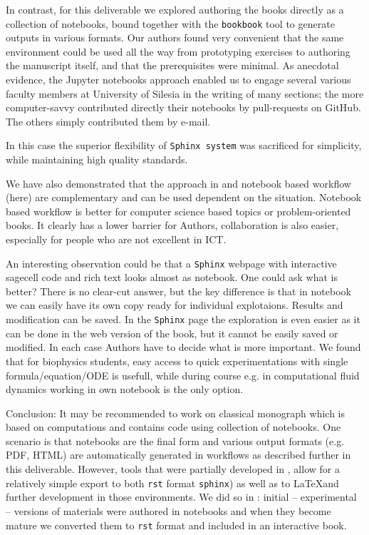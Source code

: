 \documentclass{deliverablereport}
\begin{document}
{{{In contrast, for this deliverable we explored authoring the books
directly as a collection of \Jupyter notebooks, bound together with
the \texttt{bookbook} tool to generate outputs in various formats. Our
authors found very convenient that the same environment could be used
all the way from prototyping exercises to authoring the manuscript
itself, and that the prerequisites were minimal. As anecdotal
evidence, the Jupyter notebooks approach enabled us to engage several
various faculty members at University of Silesia in the writing of
many sections; the more computer-savvy contributed directly their
notebooks by pull-requests on GitHub. The others simply contributed
them by e-mail.


In this case the superior flexibility of \texttt{Sphinx system} was
sacrificed for simplicity, while maintaining high quality standards.


We have also demonstrated that the approach in
 and notebook based workflow (here) are
complementary and can be used dependent on the situation. Notebook
based workflow is better for computer science based topics or
problem-oriented books. It clearly has a lower barrier for Authors,
collaboration is also easier, especially for people who are not
excellent in ICT.

An interesting observation could be that a \texttt{Sphinx} webpage
with interactive sagecell code and rich text looks almost as \Jupyter
notebook. One could ask what is better? There is no clear-cut answer,
but the key difference is that in \Jupyter notebook we can easily have
its own copy ready for individual explotaions. Results and
modification can be saved.  In the \texttt{Sphinx} page the
exploration is even easier as it can be done in the web version of the
book, but it cannot be easily saved or modified. In each case Authors have to
decide what is more important. We found that for biophysics students,
easy access to quick experimentations with single formula/equation/ODE
is usefull, while during course e.g. in computational fluid dynamics
working in own notebook is the only option.

Conclusion: It may be recommended to work on classical monograph which
is based on computations and contains code using collection of
notebooks. One scenario is that notebooks are the final form and
various output formats (e.g. PDF, HTML) are automatically generated
in workflows as described further in this deliverable. However, tools
that were partially developed in \ODK, allow for a relatively simple
export to both \texttt{rst} format \texttt{sphinx}) as well as to
\LaTeX and further development in those environments. We did so in
: initial -- experimental -- versions of
materials were authored in notebooks and when they become mature we
converted them to \texttt{rst} format and included in an interactive
book.

}}}
\end{document}
